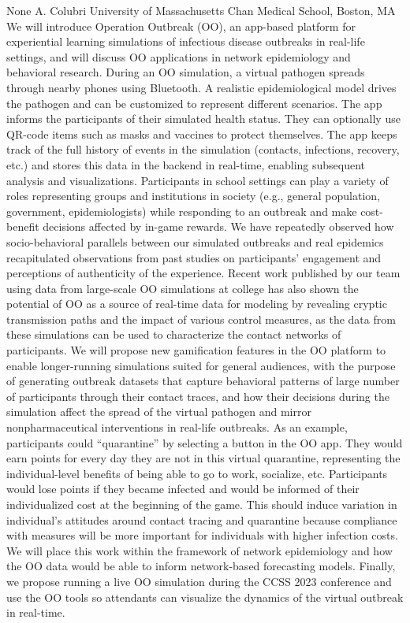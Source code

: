 
    \begin{abstract_online}{None}{%
        A. Colubri}{%
        }{%
        University of Massachusetts Chan Medical School, Boston, MA}
    We will introduce Operation Outbreak (OO), an app-based platform for experiential learning simulations of infectious disease outbreaks in real-life settings, and will discuss OO applications in network epidemiology and behavioral research. During an OO simulation, a virtual pathogen spreads through nearby phones using Bluetooth. A realistic epidemiological model drives the pathogen and can be customized to represent different scenarios. The app informs the participants of their simulated health status. They can optionally use QR-code items such as masks and vaccines to protect themselves. The app keeps track of the full history of events in the simulation (contacts, infections, recovery, etc.) and stores this data in the backend in real-time, enabling subsequent analysis and visualizations. Participants in school settings can play a variety of roles representing groups and institutions in society (e.g., general population, government, epidemiologists) while responding to an outbreak and make cost-benefit decisions affected by in-game rewards. We have repeatedly observed how socio-behavioral parallels between our simulated outbreaks and real epidemics recapitulated observations from past studies on participants’ engagement and perceptions of authenticity of the experience. Recent work published by our team using data from large-scale OO simulations at college has also shown the potential of OO as a source of real-time data for modeling by revealing cryptic transmission paths and the impact of various control measures, as the data from these simulations can be used to characterize the contact networks of participants. We will propose new gamification features in the OO platform to enable longer-running simulations suited for general audiences, with the purpose of generating outbreak datasets that capture behavioral patterns of large number of participants through their contact traces, and how their decisions during the simulation affect the spread of the virtual pathogen and mirror nonpharmaceutical interventions in real-life outbreaks. As an example, participants could “quarantine” by selecting a button in the OO app. They would earn points for every day they are not in this virtual quarantine, representing the individual-level benefits of being able to go to work, socialize, etc. Participants would lose points if they became infected and would be informed of their individualized cost at the beginning of the game. This should induce variation in individual’s attitudes around contact tracing and quarantine because compliance with measures will be more important for individuals with higher infection costs. We will place this work within the framework of network epidemiology and how the OO data would be able to inform network-based forecasting models. Finally, we propose running a live OO simulation during the CCSS 2023 conference and use the OO tools so attendants can visualize the dynamics of the virtual outbreak in real-time. 
    
    \end{abstract_online}
    